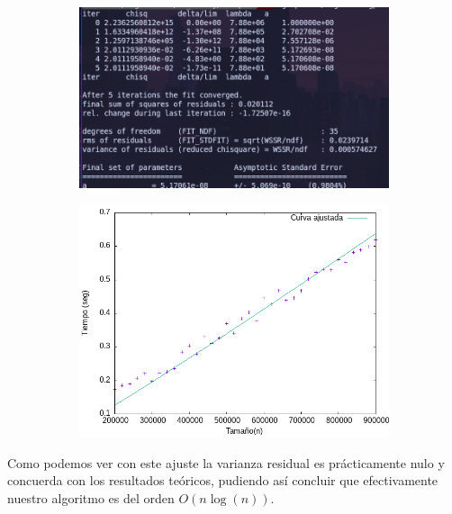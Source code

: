 \documentclass{article}
\begin{document}
    \begin{figure}[H]
    \begin{subfigure}{0.4\textwidth}
        \centering
        \includegraphics[scale = 0.40]{Problema1/Imagenes/FitLog.png}
    \end{subfigure} \hfill
    \begin{subfigure}{0.4\textwidth}
        \centering
        \includegraphics[scale = 0.40]{Problema1/Imagenes/regresion.png}
    \end{subfigure}
    \end{figure}

    Como podemos ver con este ajuste la varianza residual es prácticamente nulo y concuerda con los resultados teóricos, pudiendo así concluir que efectivamente nuestro algoritmo es del orden $O(n\log(n))$.



\newpage
\end{document}
